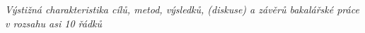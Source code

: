 \textit{Výstižná charakteristika cílů, metod, výsledků, (diskuse) a závěrů bakalářské práce v rozsahu asi 10 řádků}